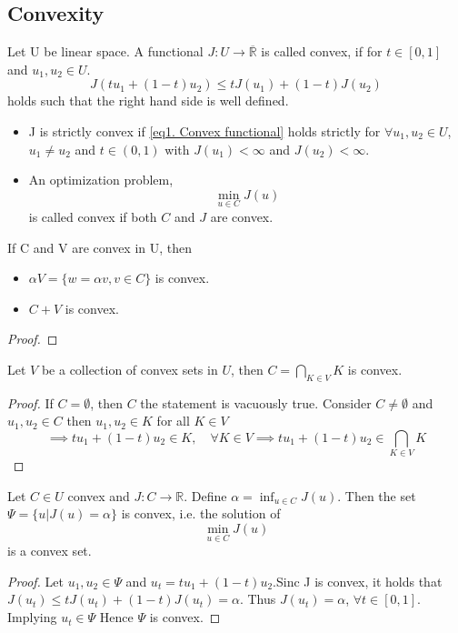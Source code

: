 \subsection{Convexity}
\begin{definition}
	Let U be linear space. A functional $J:U\rightarrow \overline{\mathbb{R}}$ is called convex, if for $t\in[0,1]$ and $u_1, u_2 \in U$.
	\begin{equation}
		J(tu_1+(1-t)u_2)\leq t J(u_1)+(1-t)J(u_2) \label{eq1. Convex functional}
	\end{equation}
	holds such that the right hand side is well defined.
	\begin{itemize}
	\item 	J is strictly convex if \eqref{eq1. Convex functional} holds strictly for $\forall u_1, u_2 \in U$, $u_1\neq u_2$ and $t \in (0,1)$ with $J(u_1)<\infty$ and $J(u_2)< \infty$.
	\item An optimization problem, 
	\[
		\min_{u \in C} J(u)
	\] is called convex if both $C$ and $J$ are convex.
	\end{itemize}
\end{definition}

\begin{lemma}
	If C and V are convex in U, then
	\begin{itemize}
		\item  $\alpha V = \lbrace w = \alpha v, v\in C \rbrace$ is convex.
		\item $C+V$ is convex.
	\end{itemize}
	\begin{proof}
		
	\end{proof}
\end{lemma}


\begin{lemma}
	Let $V$ be a collection of convex sets in $U$, then $C=\bigcap_{K \in V} K$ is convex.
	\begin{proof}
			If $C = \emptyset$, then $C$ the statement is vacuously true. Consider $C\neq \emptyset$ and $u_1, u_2 \in C$ then $u_1, u_2 \in K$ for all $K \in V$
			\[
			\implies tu_1+(1-t)u_2 \in K, \quad \forall K \in V \implies tu_1+(1-t)u_2 \in \bigcap_{K \in V} K 
			\]
	\end{proof}
\end{lemma}

\begin{lemma}
		Let $C\in U$ convex and $J: C \rightarrow \mathbb{R}$. Define $\alpha=\inf_{u\in C} J(u)$. Then the set $\Psi = \{u | J(u)=\alpha\}$ is convex, i.e. the solution of 
		\[
			\min_{u \in C} J(u)
		\] 
		is a convex set.
		\begin{proof}
			Let $u_1, u_2 \in \Psi$ and $u_t=tu_1+(1-t)u_2$.Sinc J is convex, it holds that
			$J(u_t)\leq t J(u_t)+(1-t)J(u_t)=\alpha$. Thus $J(u_t)=\alpha$, $\forall t \in [0,1]$. Implying $u_t \in \Psi$ Hence $\Psi$ is convex.
		\end{proof}
\end{lemma}

